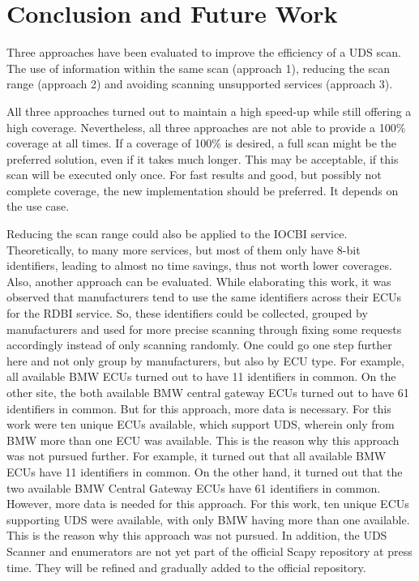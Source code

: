 \section{Conclusion and Future Work}

Three approaches have been evaluated to improve the efficiency of a UDS scan. The use of information within the same scan (approach 1), reducing the scan range (approach 2) and avoiding scanning unsupported services (approach 3).

All three approaches turned out to maintain a high speed-up while still offering a high coverage.
Nevertheless, all three approaches are not able to provide a 100\% coverage at all times. 
If a coverage of 100\% is desired, a full scan might be the preferred solution, even if it takes much longer. This may be acceptable, if this scan will be executed only once. For fast results and good, but possibly not complete coverage, the new implementation should be preferred. It depends on the use case.

Reducing the scan range could also be applied to the IOCBI service. Theoretically, to many more services, but most of them only have 8-bit identifiers, leading to almost no time savings, thus not worth lower coverages. Also, another approach can be evaluated. While elaborating this work, it was observed that manufacturers tend to use the same identifiers across their ECUs for the RDBI service. So, these identifiers could be collected, grouped by manufacturers and used for more precise scanning through fixing some requests accordingly instead of only scanning randomly. One could go one step further here and not only group by manufacturers, but also by ECU type.
For example, all available BMW ECUs turned out to have 11 identifiers in common. On the other site, the both available BMW central gateway ECUs turned out to have 61 identifiers in common. But for this approach, more data is necessary. For this work were ten unique ECUs available, which support UDS, wherein only from BMW more than one ECU was available. This is the reason why this approach was not pursued further.
For example, it turned out that all available BMW ECUs have 11 identifiers in common. On the other hand, it turned out that the two available BMW Central Gateway ECUs have 61 identifiers in common. However, more data is needed for this approach. For this work, ten unique ECUs supporting UDS were available, with only BMW having more than one available. This is the reason why this approach was not pursued.
In addition, the UDS Scanner and enumerators are not yet part of the official Scapy repository at press time. They will be refined and gradually added to the official repository.
